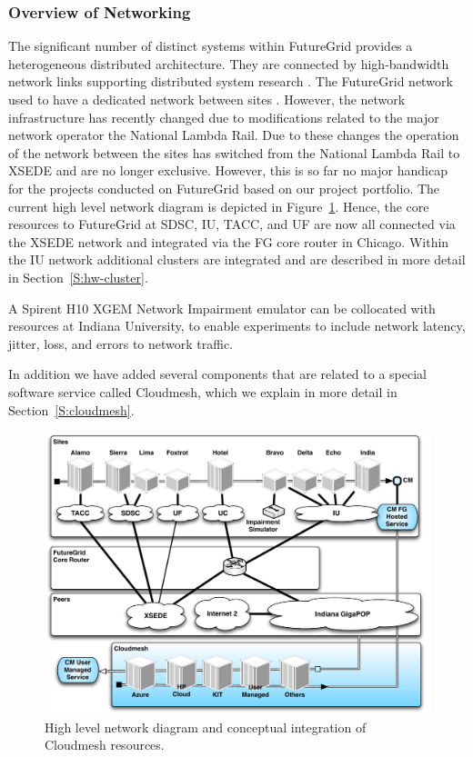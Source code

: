 \documentclass[graybox]{svmult}
\begin{document}






\subsubsection{Overview of Networking}

The significant number of distinct systems within FutureGrid provides a heterogeneous distributed architecture.  They are connected by high-bandwidth network links supporting distributed system research \cite{las12fg-bookchapter}. The FutureGrid network used to have a dedicated network between sites \cite{las12fg-bookchapter}. However, the network infrastructure has recently changed due to modifications related to the major network operator the National Lambda Rail.  Due to these changes the operation of the network between the sites has switched from the National Lambda Rail to XSEDE and are no longer exclusive. However, this is so far no major handicap for the projects conducted on FutureGrid based on our project portfolio.  The current high level network diagram is depicted in Figure~\ref{F:network}. Hence, the core resources to FutureGrid at SDSC, IU, TACC, and UF are now all connected via the XSEDE network and integrated via the FG core router in Chicago. Within the IU network additional clusters are integrated and are described in more detail in Section~\ref{S:hw-cluster}.

A Spirent H10 XGEM Network Impairment emulator \cite{www-network-impairment} can be collocated with resources at Indiana University, to enable experiments to include network latency, jitter, loss, and errors to network traffic. 

In addition we have added several components that are related to a special software service called Cloudmesh, which we explain in more detail in Section~\ref{S:cloudmesh}. 


\begin{figure}[htb]
 \centering
   \includegraphics[width=1.0\textwidth]{images/fg-network-2014-cm.pdf}
 \caption{High level network diagram and conceptual integration of Cloudmesh resources.}
\label{F:network}
\end{figure}
\end{document}
